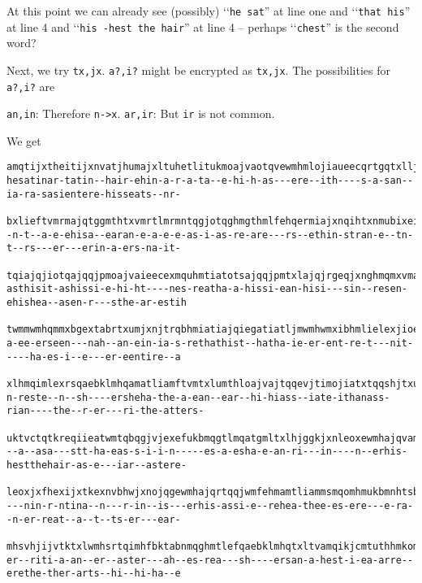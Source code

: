 At this point we can already see (possibly)
\lq\lq\verb!he sat!''
at line one 
and \lq\lq\verb!that his!'' at line 4
and \lq\lq\verb!his -hest the hair!'' at line 4 -- perhaps \lq\lq\verb!chest!'' is the second word?

Next, we try \verb!tx,jx!.
\verb!a?,i?! might be encrypted as \verb!tx,jx!.
The possibilities for \verb!a?,i?! are
\begin{tightlist}
  \li \verb!an,in!: Therefore \verb!n->x!.
  \li \verb!ar,ir!: But \verb!ir! is not common.
\end{tightlist}
We get
  \begin{Verbatim}[frame=single,fontsize=\tiny]
amqtijxtheitijxnvatjhumajxltuhetlitukmoajvaotqvewmhmlojiaueecqrtgqtxlljtnhtrqtqjmximhmlajqqmtiqgbxhe
hesatinar-tatin--hair-ehin-a-r-a-ta--e-hi-h-as---ere--ith----s-a-san--ia-ra-sasientere-hisseats--nr-

bxlieftvmrmajqtggmthtxvmrtlmrmntqgjotqghmgthmlfehqermiajxnqihtxnmubixeifehqeewmhgeomhjxntgmhqextkjis
-n-t--a-e-ehisa--earan-e-a-e-e-as-i-as-re-are---rs--ethin-stran-e--tn-t--rs---er---erin-a-ers-na-it-

tqiajqjiotqajqqjpmoajvaieecexmquhmtiatotsajqqjpmtxlajqjrgeqjxnghmqmxvmajqamtlotqmxehrebqiamkthnmqija
asthisit-ashissi-e-hi-ht----nes-reatha-a-hissi-ean-hisi---sin--resen-ehishea--asen-r---sthe-ar-estih

twmmwmhqmmxbgextabrtxumjxnjtrqbhmiatiajqiegatiatljmwmhwmxibhmlielexjioebklatwmqkjggmlewmhrmmxijhmkst
a-ee-erseen---nah--an-ein-ia-s-rethathist--hatha-ie-er-ent-re-t---nit-----ha-es-i--e---er-eentire--a

xlhmqimlexrsqaebklmhqamatliamftvmtxlumthloajvajtqqevjtimojiatxtqqshjtxubkkiamfehrmhfkehjliamktiimhqe
n-reste--n--sh----ersheha-the-a-ean--ear--hi-hiass--iate-ithanass-rian----the--r-er---ri-the-atters-

uktvctqtkreqiieatwmtqbqgjvjexefukbmqgtlmqatgmltxlhjggkjxnleoxewmhajqvamqiiamatjhotqgmvbkjthgktqimhml
--a--asa---stt-ha-eas-s-i-i-n-----es-a-esha-e-an-ri---in----n--erhis-hestthehair-as-e---iar--astere-

leoxjxfhexijxtkexnvbhwjxnojqgewmhajqrtqqjwmfehmamtliammsmqomhmukbmnhtsbxlmhnhmtiuktvcibfiqwmhsvkmthw
---nin-r-ntina--n---r-in--is---erhis-assi-e--rehea-thee-es-ere---e-ra--n-er-reat--a--t--ts-er---ear-

mhsvhjijvtktxlwmhsrtqimhfbktabnmqghmtlefqaebklmhqtxltvamqikjcmtuthhmkomhmiameiamhgthiqefajroajvatggm
er--riti-a-an--er--aster---ah--es-rea---sh----ersan-a-hest-i-ea-arre--erethe-ther-arts--hi--hi-ha--e


\end{Verbatim}
